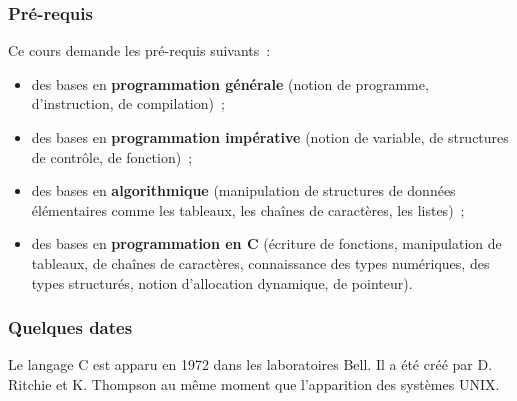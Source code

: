 \begin{frame} \frametitle{Pré-requis}
Ce cours demande les pré-requis suivants~:
\smallskip

\begin{itemize}
    \item des bases en {\bf programmation générale} (notion de programme, 
    d'instruction, de compilation)~;
    \medskip

    \item des bases en {\bf programmation impérative} (notion de variable,
    de structures de contrôle, de fonction)~;
    \medskip
    
    \item des bases en {\bf algorithmique} (manipulation de structures de 
    données élémentaires comme les tableaux, les chaînes de caractères,
    les listes)~;
    \medskip
    
    \item des bases en {\bf programmation en {\sf C}} (écriture de 
    fonctions, manipulation de tableaux, de chaînes de caractères, 
    connaissance des types numériques, des types structurés, 
    notion d'allocation dynamique, de pointeur).
\end{itemize}
\end{frame}

\begin{frame} \frametitle{Quelques dates}
Le langage {\sf C} est apparu en 1972 dans les laboratoires Bell.
Il a été créé par \alert{D. Ritchie} et \alert{K. Thompson}
au même moment que l'apparition des systèmes {\sf UNIX}.
\medskip


\end{frame}

